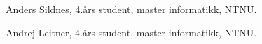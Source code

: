 \documentclass[journal]{IEEEtran}
\begin{document}
%

%


\begin{IEEEbiographynophoto}{Anders Sildnes,}
    4.års student, master informatikk, NTNU.\
\end{IEEEbiographynophoto}
\begin{IEEEbiographynophoto}{Andrej Leitner,}
    4.års student, master informatikk, NTNU.\
\end{IEEEbiographynophoto}
\end{document}
